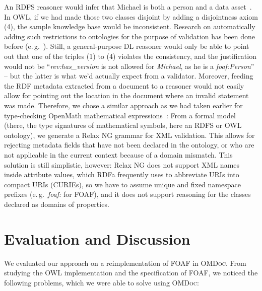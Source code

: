 \documentclass{llncs}
\renewcommand{\omdoc}{\textsc{OMDoc}\xspace}
\begin{document}
An RDFS reasoner would infer that Michael is both a person and a data
asset~\cite{BrGu04:rdfs}.  In OWL, if we had made those two classes disjoint by adding a
disjointness axiom (4), the sample knowledge base would be inconsistent.  Research on
automatically adding such restrictions to ontologies for the purpose of validation has
been done before (e.\,g.\ \cite{LiEtAl:ValidatingOWL}).  Still, a general-purpose DL
reasoner would only be able to point out that one of the triples (1) to (4) violates the
consistency, and the justification would not be ``\textit{rev:has\_version} is not allowed
for \textit{Michael}, as he is a \textit{foaf:Person}'' -- but the latter is what we'd
actually expect from a validator.  Moreover, feeding the RDF metadata extracted from a
document to a reasoner would not easily allow for pointing out the location in the
document where an invalid statement was made.  Therefore, we chose a similar approach as
we had taken earlier for type-checking OpenMath mathematical
expressions~\cite{Kohlhase:STS-RelaxNG08}: From a formal model (there, the type signatures
of mathematical symbols, here an RDFS or OWL ontology), we generate a Relax NG grammar for
XML validation.  This allows for rejecting metadata fields that have not been declared in
the ontology, or who are not applicable in the current context because of a domain
mismatch.  This solution is still simplistic, however: Relax NG does not support XML names
inside attribute values, which RDFa frequently uses to abbreviate URIs into compact URIs
(CURIEs), so we have to assume unique and fixed namespace prefixes (e.\,g.\ \textit{foaf:}
for FOAF), and it does not support reasoning for the classes declared as domains of
properties.%
\fi


\section{Evaluation and Discussion}
\label{sec:eval}

We evaluated our approach on a reimplementation of FOAF in \omdoc.  From studying the OWL
implementation and the specification of FOAF, we noticed the following problems, which we
were able to solve using \omdoc:
\end{document}
